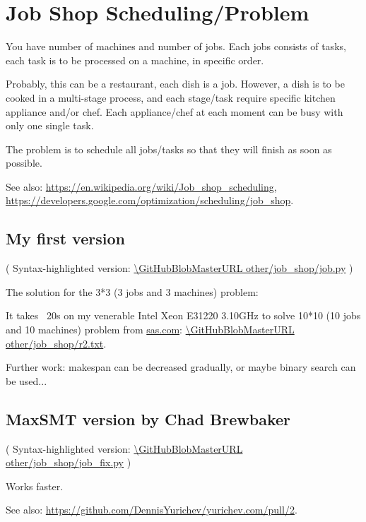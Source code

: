 \section{Job Shop Scheduling/Problem}
\label{JobShop}

\renewcommand{\CURPATH}{other/job_shop}

You have number of machines and number of jobs.
Each jobs consists of tasks, each task is to be processed on a machine, in specific order.

Probably, this can be a restaurant, each dish is a job.
However, a dish is to be cooked in a multi-stage process, and each stage/task require specific kitchen appliance and/or chef.
Each appliance/chef at each moment can be busy with only one single task.

The problem is to schedule all jobs/tasks so that they will finish as soon as possible.

See also:
\url{https://en.wikipedia.org/wiki/Job_shop_scheduling},
\url{https://developers.google.com/optimization/scheduling/job_shop}.

\subsection{My first version}



( Syntax-highlighted version: \url{\GitHubBlobMasterURL\CURPATH/job.py} )

The solution for the 3*3 (3 jobs and 3 machines) problem:



It takes ~20s on my venerable Intel Xeon E31220 3.10GHz to solve 10*10 (10 jobs and 10 machines) problem from 
\href{http://support.sas.com/documentation/cdl/en/orcpug/63973/HTML/default/viewer.htm#orcpug_clp_sect048.htm}{sas.com}:
\url{\GitHubBlobMasterURL\CURPATH/r2.txt}.

Further work: makespan can be decreased gradually, or maybe binary search can be used...

\subsection{MaxSMT version by Chad Brewbaker}



( Syntax-highlighted version: \url{\GitHubBlobMasterURL\CURPATH/job_fix.py} )

Works faster.

See also: \url{https://github.com/DennisYurichev/yurichev.com/pull/2}.

